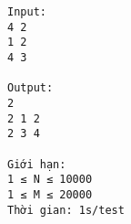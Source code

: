\begin{verbatim}
Input:
4 2
1 2
4 3

Output:
2
2 1 2
2 3 4

Giới hạn:
1 ≤ N ≤ 10000
1 ≤ M ≤ 20000
Thời gian: 1s/test
\end{verbatim}
